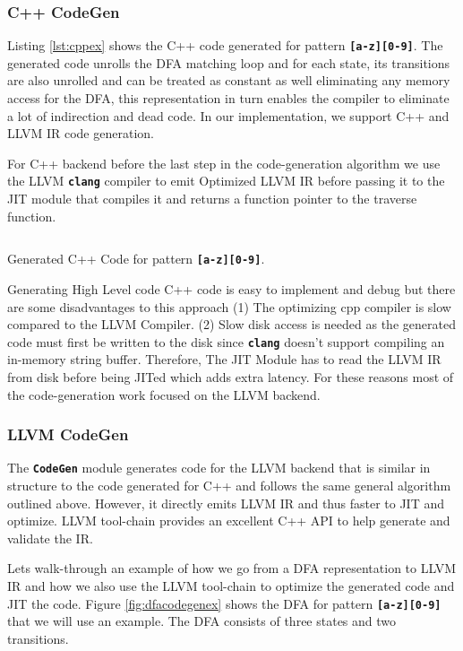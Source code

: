 \subsubsection{C++ CodeGen}
Listing \ref{lst:cppex} shows the C++ code generated for pattern \texttt{\textbf{[a-z][0-9]}}. The generated code unrolls the DFA matching loop and for each state, its transitions are also unrolled and can be treated as constant as well eliminating any memory access for the DFA, this representation in turn enables the compiler to eliminate a lot of indirection and dead code. In our implementation, we support C++ and LLVM IR code generation.

For C++ backend before the last step in the code-generation algorithm we use the LLVM \texttt{\textbf{clang}} compiler to emit Optimized LLVM IR before passing it to the JIT module that compiles it and returns a function pointer to the traverse function. 

\begin{listing}[htbp]
\inputminted[breaklines,frame=lines,linenos]{cpp}{code/ex.cpp}
\caption{Generated C++ Code for pattern \texttt{\textbf{[a-z][0-9]}}.}
\label{lst:cppex}
\end{listing}

Generating High Level code C++ code is easy to implement and debug but there are some disadvantages to this approach (1) The optimizing cpp compiler is slow compared to the LLVM Compiler. (2) Slow disk access is needed as the generated code must first be written to the disk since \texttt{\textbf{clang}} doesn't support compiling an in-memory string buffer. Therefore, The JIT Module has to read the LLVM IR from disk before being JITed which adds extra latency. For these reasons most of the code-generation work focused on the LLVM backend.


\subsubsection{LLVM CodeGen}
The \texttt{\textbf{CodeGen}} module generates code for the LLVM backend that is similar in structure to the code generated for C++ and follows the same general algorithm outlined above. However, it directly emits LLVM IR and thus faster to JIT and optimize. LLVM tool-chain provides an excellent C++ API \cite{llvmapi} to help generate and validate the IR.

Lets walk-through an example of how we go from a DFA representation to LLVM IR and how we also use the LLVM tool-chain to optimize the generated code and JIT the code. Figure \ref{fig:dfacodegenex} shows the DFA for pattern \texttt{\textbf{[a-z][0-9]}} that we will use an example. The DFA consists of three states and two transitions.

